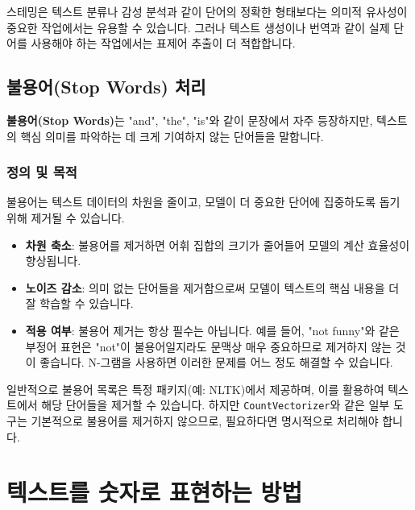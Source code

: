 \documentclass[11pt,a4paper]{article}
\theoremstyle{definition}
\begin{document}
\begin{tcolorbox}[warningbox, title=\textbf{주의}]
스테밍은 텍스트 분류나 감성 분석과 같이 단어의 정확한 형태보다는 의미적 유사성이 중요한 작업에서는 유용할 수 있습니다. 그러나 텍스트 생성이나 번역과 같이 실제 단어를 사용해야 하는 작업에서는 표제어 추출이 더 적합합니다.
\end{tcolorbox}

\subsection{불용어(Stop Words) 처리}

\begin{tcolorbox}[conceptbox, title=\textbf{핵심 개념}]
\textbf{불용어(Stop Words)}는 "and", "the", "is"와 같이 문장에서 자주 등장하지만, 텍스트의 핵심 의미를 파악하는 데 크게 기여하지 않는 단어들을 말합니다.
\end{tcolorbox}

\subsubsection{정의 및 목적}
불용어는 텍스트 데이터의 차원을 줄이고, 모델이 더 중요한 단어에 집중하도록 돕기 위해 제거될 수 있습니다.

\begin{itemize}
    \item \textbf{차원 축소}: 불용어를 제거하면 어휘 집합의 크기가 줄어들어 모델의 계산 효율성이 향상됩니다.
    \item \textbf{노이즈 감소}: 의미 없는 단어들을 제거함으로써 모델이 텍스트의 핵심 내용을 더 잘 학습할 수 있습니다.
    \item \textbf{적용 여부}: 불용어 제거는 항상 필수는 아닙니다. 예를 들어, "not funny"와 같은 부정어 표현은 "not"이 불용어일지라도 문맥상 매우 중요하므로 제거하지 않는 것이 좋습니다. N-그램을 사용하면 이러한 문제를 어느 정도 해결할 수 있습니다.
\end{itemize}

\begin{tcolorbox}[examplebox, title=\textbf{예시}]
일반적으로 불용어 목록은 특정 패키지(예: NLTK)에서 제공하며, 이를 활용하여 텍스트에서 해당 단어들을 제거할 수 있습니다. 하지만 \texttt{CountVectorizer}와 같은 일부 도구는 기본적으로 불용어를 제거하지 않으므로, 필요하다면 명시적으로 처리해야 합니다.
\end{tcolorbox}

\newpage
\section{텍스트를 숫자로 표현하는 방법}
\end{document}
